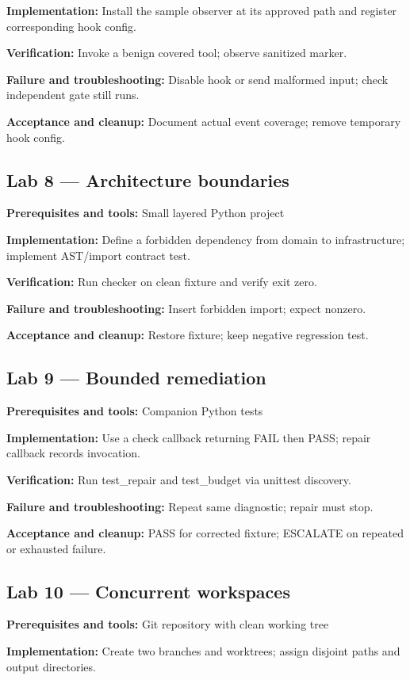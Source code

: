 \documentclass[11pt,letterpaper]{article}
\begin{document}
\textbf{Implementation:} Install the sample observer at its approved path and register corresponding hook config.

\textbf{Verification:} Invoke a benign covered tool; observe sanitized marker.

\textbf{Failure and troubleshooting:} Disable hook or send malformed input; check independent gate still runs.

\textbf{Acceptance and cleanup:} Document actual event coverage; remove temporary hook config.

\subsection*{Lab 8 --- Architecture boundaries}
\textbf{Prerequisites and tools:} Small layered Python project

\textbf{Implementation:} Define a forbidden dependency from domain to infrastructure; implement AST/import contract test.

\textbf{Verification:} Run checker on clean fixture and verify exit zero.

\textbf{Failure and troubleshooting:} Insert forbidden import; expect nonzero.

\textbf{Acceptance and cleanup:} Restore fixture; keep negative regression test.

\subsection*{Lab 9 --- Bounded remediation}
\textbf{Prerequisites and tools:} Companion Python tests

\textbf{Implementation:} Use a check callback returning FAIL then PASS; repair callback records invocation.

\textbf{Verification:} Run test\_repair and test\_budget via unittest discovery.

\textbf{Failure and troubleshooting:} Repeat same diagnostic; repair must stop.

\textbf{Acceptance and cleanup:} PASS for corrected fixture; ESCALATE on repeated or exhausted failure.

\subsection*{Lab 10 --- Concurrent workspaces}
\textbf{Prerequisites and tools:} Git repository with clean working tree

\textbf{Implementation:} Create two branches and worktrees; assign disjoint paths and output directories.
\end{document}
